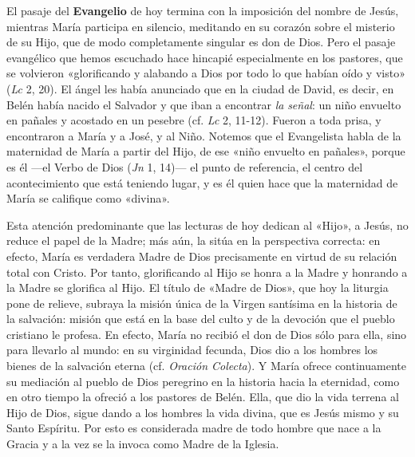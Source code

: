 \documentclass[]{article}
\begin{document}
El pasaje del \textbf{Evangelio} de hoy termina con la imposición del
nombre de Jesús, mientras María participa en silencio, meditando en su
corazón sobre el misterio de su Hijo, que de modo completamente singular
es don de Dios. Pero el pasaje evangélico que hemos escuchado hace
hincapié especialmente en los pastores, que se volvieron «glorificando y
alabando a Dios por todo lo que habían oído y visto» (\emph{Lc} 2, 20).
El ángel les había anunciado que en la ciudad de David, es decir, en
Belén había nacido el Salvador y que iban a encontrar \emph{la}
\emph{señal}: un niño envuelto en pañales y acostado en un pesebre (cf.
\emph{Lc} 2, 11-12). Fueron a toda prisa, y encontraron a María y a
José, y al Niño. Notemos que el Evangelista habla de la maternidad de
María a partir del Hijo, de ese «niño envuelto en pañales», porque es él
---el Verbo de Dios (\emph{Jn} 1, 14)--- el punto de referencia, el
centro del acontecimiento que está teniendo lugar, y es él quien hace
que la maternidad de María se califique como «divina».

Esta atención predominante que las lecturas de hoy dedican al «Hijo», a
Jesús, no reduce el papel de la Madre; más aún, la sitúa en la
perspectiva correcta: en efecto, María es verdadera Madre de Dios
precisamente en virtud de su relación total con Cristo. Por tanto,
glorificando al Hijo se honra a la Madre y honrando a la Madre se
glorifica al Hijo. El título de «Madre de Dios», que hoy la liturgia
pone de relieve, subraya la misión única de la Virgen santísima en la
historia de la salvación: misión que está en la base del culto y de la
devoción que el pueblo cristiano le profesa. En efecto, María no recibió
el don de Dios sólo para ella, sino para llevarlo al mundo: en su
virginidad fecunda, Dios dio a los hombres los bienes de la salvación
eterna (cf. \emph{Oración Colecta}). Y María ofrece continuamente su
mediación al pueblo de Dios peregrino en la historia hacia la eternidad,
como en otro tiempo la ofreció a los pastores de Belén. Ella, que dio la
vida terrena al Hijo de Dios, sigue dando a los hombres la vida divina,
que es Jesús mismo y su Santo Espíritu. Por esto es considerada madre de
todo hombre que nace a la Gracia y a la vez se la invoca como Madre de
la Iglesia.
\end{document}
